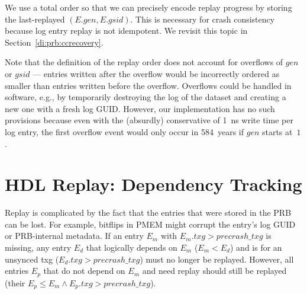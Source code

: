 \documentclass[12pt,a4paper,twoside]{book}
\begin{document}
We use a total order so that we can precisely encode replay progress by storing the last-replayed $(E.gen, E.gsid)$.
This is necessary for crash consistency because log entry replay is not idempotent.
We revisit this topic in Section~\ref{di:prb:ccrecovery}.

Note that the definition of the replay order does not account for overflows of $gen$ or $gsid$ --- entries written after the overflow would be incorrectly ordered as smaller than entries written before the overflow.
Overflows could be handled in software, e.g., by temporarily destroying the log of the dataset and creating a new one with a fresh log GUID.
However, our implementation has no such provisions because even with the (absurdly) conservative of 1~ns write time per log entry, the first overflow event would only occur in 584~years if $gen$ starts at~$1$.

\section{HDL Replay: Dependency Tracking}\label{di:prb:deptrack}
Replay is complicated by the fact that the entries that were stored in the PRB can be lost.
For example, bitflips in PMEM might corrupt the entry's log GUID or PRB-internal metadata.
If an entry $E_m$ with $E_m.txg > precrash\_txg$ is missing, any entry $E_d$ that logically depends on $E_m$ ($E_m < E_d$) and is for an unsynced txg ($E_d.txg > precrash\_txg$) must no longer be replayed.
However, all entries $E_p$ that do not depend on $E_m$ and need replay should still be replayed (their $E_p \le E_m \wedge E_p.txg > precrash\_txg$).
\end{document}

